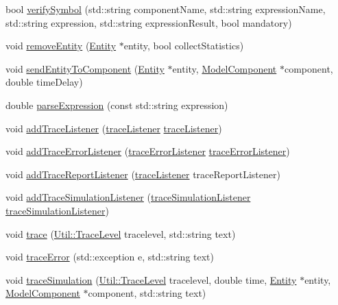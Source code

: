 \begin{DoxyCompactItemize}
\item 
bool \hyperlink{class_model_ae2be8579f8519eec5da9e6f72c7ec361}{verify\-Symbol} (std\-::string component\-Name, std\-::string expression\-Name, std\-::string expression, std\-::string expression\-Result, bool mandatory)
\item 
void \hyperlink{class_model_ae62bb3a21cd56fbf9d34195edf2fb9e0}{remove\-Entity} (\hyperlink{class_entity}{Entity} $\ast$entity, bool collect\-Statistics)
\item 
void \hyperlink{class_model_a244dff6d6bef962b0d95fbe712954079}{send\-Entity\-To\-Component} (\hyperlink{class_entity}{Entity} $\ast$entity, \hyperlink{class_model_component}{Model\-Component} $\ast$component, double time\-Delay)
\item 
double \hyperlink{class_model_a5ea283e339b50c0b77040bf908e25af3}{parse\-Expression} (const std\-::string expression)
\item 
void \hyperlink{class_model_a144f16211e64bdc0ac4622cda5f5f4ae}{add\-Trace\-Listener} (\hyperlink{_listener_8h_a5ce1a9a31f5f0fa77de45c6e6622c435}{trace\-Listener} \hyperlink{_listener_8h_a5ce1a9a31f5f0fa77de45c6e6622c435}{trace\-Listener})
\item 
void \hyperlink{class_model_a0b632c73e85b352d7ea914b30bb455f9}{add\-Trace\-Error\-Listener} (\hyperlink{_listener_8h_afad9be20bdf6a8241ae57bc2fcb678c7}{trace\-Error\-Listener} \hyperlink{_listener_8h_afad9be20bdf6a8241ae57bc2fcb678c7}{trace\-Error\-Listener})
\item 
void \hyperlink{class_model_ad94736b0e6c53b3dedd112f21506092a}{add\-Trace\-Report\-Listener} (\hyperlink{_listener_8h_a5ce1a9a31f5f0fa77de45c6e6622c435}{trace\-Listener} trace\-Report\-Listener)
\item 
void \hyperlink{class_model_a06f7035263e7ad33360651a9569ed2d6}{add\-Trace\-Simulation\-Listener} (\hyperlink{_listener_8h_a615775a0e20f41866ee44014f198fa59}{trace\-Simulation\-Listener} \hyperlink{_listener_8h_a615775a0e20f41866ee44014f198fa59}{trace\-Simulation\-Listener})
\item 
void \hyperlink{class_model_a5de086b514742e84b61ac9a7b128ae8b}{trace} (\hyperlink{class_util_a604561d00f5999b5ca280401140e58d9}{Util\-::\-Trace\-Level} tracelevel, std\-::string text)
\item 
void \hyperlink{class_model_a092b7062edcb59344f286d858ed10fac}{trace\-Error} (std\-::exception e, std\-::string text)
\item 
void \hyperlink{class_model_a0d866e0ef942638d63c1d8c3eb98fa19}{trace\-Simulation} (\hyperlink{class_util_a604561d00f5999b5ca280401140e58d9}{Util\-::\-Trace\-Level} tracelevel, double time, \hyperlink{class_entity}{Entity} $\ast$entity, \hyperlink{class_model_component}{Model\-Component} $\ast$component, std\-::string text)

\end{DoxyCompactItemize}
